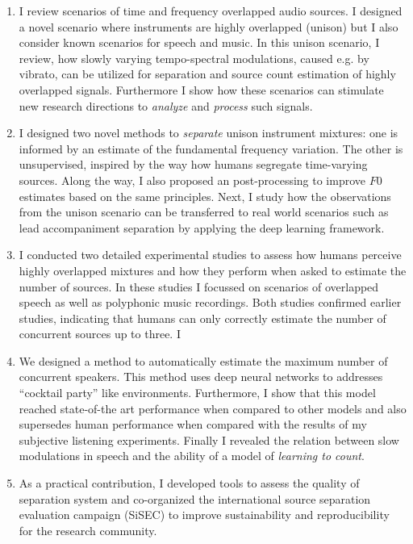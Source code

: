 \begin{enumerate}
\item I review scenarios of time and frequency overlapped audio sources.
I designed a novel scenario where instruments are highly overlapped (unison) but I also consider known scenarios for speech and music.
In this unison scenario, I review, how slowly varying tempo-spectral modulations, caused e.g. by vibrato, can be utilized for separation and source count estimation of highly overlapped signals.
Furthermore I show how these scenarios can stimulate new research directions to \emph{analyze} and \emph{process} such signals.\\

\item I designed two novel methods to \emph{separate} unison instrument mixtures: one is informed by an estimate of the fundamental frequency variation.
The other is unsupervised, inspired by the way how humans segregate time-varying sources.
Along the way, I also proposed an post-processing to improve \(F0\) estimates based on the same principles.
Next, I study how the observations from the unison scenario can be transferred to real world scenarios such as lead accompaniment separation by applying the deep learning framework.
\\

\item I conducted two detailed experimental studies to assess how humans perceive highly overlapped mixtures and how they perform when asked to estimate the number of sources.
In these studies I focussed on scenarios of overlapped speech as well as polyphonic music recordings.
Both studies confirmed earlier studies, indicating that humans can only correctly estimate the number of concurrent sources up to three.
I \\

\item We designed a method to automatically estimate the maximum number of concurrent speakers. This method uses deep neural networks to addresses ``cocktail party'' like environments.
Furthermore, I show that this model reached state-of-the art performance when compared to other models and also supersedes human performance when compared with the results of my subjective listening experiments.
Finally I revealed the relation between slow modulations in speech and the ability of a model of \emph{learning to count}.\\

\item As a practical contribution, I developed tools to assess the quality of separation system and co-organized the international source separation evaluation campaign (SiSEC) to improve sustainability and reproducibility for the research community.
\end{enumerate}

